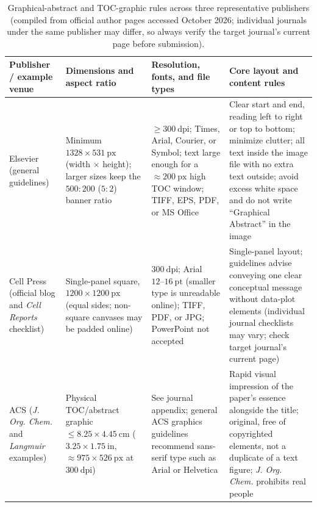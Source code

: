 \begin{table}[htbp]\centering\footnotesize
\setlength{\tabcolsep}{3pt}
\renewcommand{\arraystretch}{1.15}
\caption{Graphical-abstract and TOC-graphic rules across three representative publishers (compiled from official author pages accessed October 2026; individual journals under the same publisher may differ, so always verify the target journal's current page before submission).}\label{tab:ch10-01-rules}
\begin{tabularx}{\linewidth}{@{}>{\raggedright\arraybackslash}p{23mm}>{\raggedright\arraybackslash}p{28mm}>{\raggedright\arraybackslash}p{26mm}Y@{}}
\toprule
\textbf{Publisher / example venue} & \textbf{Dimensions and aspect ratio} & \textbf{Resolution, fonts, and file types} & \textbf{Core layout and content rules} \\
\midrule
Elsevier (general guidelines) & Minimum $1328 \times 531\ \text{px}$ (width $\times$ height); larger sizes keep the $500:200$ ($5:2$) banner ratio & $\ge 300\ \text{dpi}$; Times, Arial, Courier, or Symbol; text large enough for a $\approx 200\ \text{px}$ high TOC window; TIFF, EPS, PDF, or MS Office & Clear start and end, reading left to right or top to bottom; minimize clutter; all text inside the image file with no extra text outside; avoid excess white space and do not write ``Graphical Abstract'' in the image \\
Cell Press (official blog and \textit{Cell Reports} checklist) & Single-panel square, $1200 \times 1200\ \text{px}$ (equal sides; non-square canvases may be padded online) & $300\ \text{dpi}$; Arial $12\text{--}16\ \text{pt}$ (smaller type is unreadable online); TIFF, PDF, or JPG; PowerPoint not accepted & Single-panel layout; guidelines advise conveying one clear conceptual message without data-plot elements (individual journal checklists may vary; check target journal's current page) \\
ACS (\textit{J. Org. Chem.} and \textit{Langmuir} examples) & Physical TOC/abstract graphic $\le 8.25 \times 4.45\ \text{cm}$ ($3.25 \times 1.75\ \text{in}$, $\approx 975 \times 526\ \text{px}$ at $300\ \text{dpi}$) & See journal appendix; general ACS graphics guidelines recommend sans-serif type such as Arial or Helvetica & Rapid visual impression of the paper's essence alongside the title; original, free of copyrighted elements, not a duplicate of a text figure; \textit{J. Org. Chem.} prohibits real people \\
\bottomrule
\end{tabularx}
\end{table}

